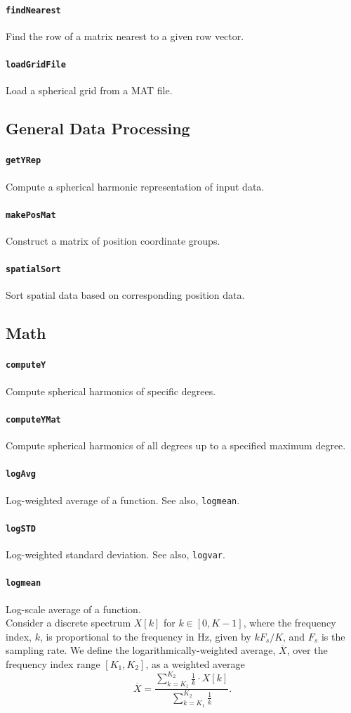\documentclass[11pt, oneside]{article}
\newcommand{\function}[1]{\paragraph*{\texttt{#1}}}
\begin{document}
\function{findNearest} Find the row of a matrix nearest to a given row vector. \\

\function{loadGridFile} Load a spherical grid from a MAT file. \\

\subsection{General Data Processing}

\function{getYRep} Compute a spherical harmonic representation of input data. \\

\function{makePosMat} Construct a matrix of position coordinate groups. \\

\function{spatialSort} Sort spatial data based on corresponding position data. \\

\subsection{Math}

\function{computeY} Compute spherical harmonics of specific degrees. \\

\function{computeYMat} Compute spherical harmonics of all degrees up to a specified maximum degree. \\

\function{logAvg} Log-weighted average of a function.
See also, \texttt{logmean}. \\

\function{logSTD} Log-weighted standard deviation.
See also, \texttt{logvar}. \\

\function{logmean} Log-scale average of a function. \\
Consider a discrete spectrum $X[k]$ for $k \in [0, K-1]$, where the frequency index, $k$, is proportional to the frequency in Hz, given by $k F_s/K$, and $F_s$ is the sampling rate.
We define the logarithmically-weighted average, $\overline{X}$, over the frequency index range $[K_1, K_2]$, as a weighted average
\begin{equation}\label{eq:logmean}
\overline{X} = \frac{\displaystyle \sum_{k=K_1}^{K_2} \frac{1}{k} \cdot X[k]}{\displaystyle \sum_{k=K_1}^{K_2} \frac{1}{k}}.
\end{equation}
\end{document}
